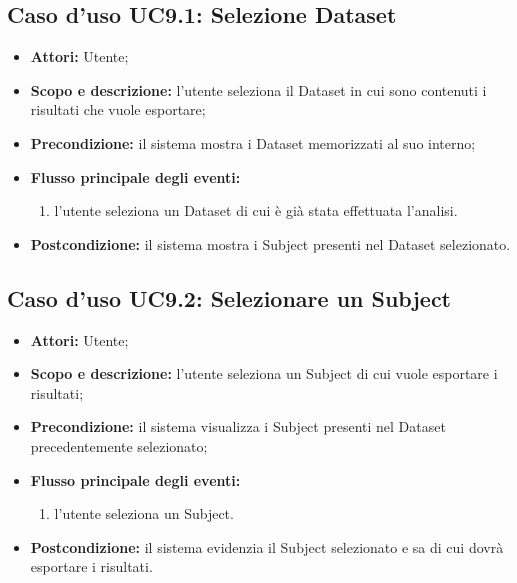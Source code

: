 \subsection{Caso d'uso UC9.1: Selezione Dataset}
\begin{itemize}
\item \textbf{Attori:} Utente;
\item \textbf{Scopo e descrizione:} l'utente seleziona il Dataset\glossario{} in cui sono contenuti i risultati che vuole esportare;
\item \textbf{Precondizione:} il sistema mostra i Dataset\glossario{} memorizzati al suo interno;
\item \textbf{Flusso principale degli eventi:}
\begin{enumerate}
\item l'utente seleziona un Dataset\glossario{} di cui è già stata effettuata l'analisi. 
\end{enumerate}
\item \textbf{Postcondizione:} il sistema mostra i Subject\glossario{} presenti nel Dataset\glossario{} selezionato.
\end{itemize}

\subsection{Caso d'uso UC9.2: Selezionare un Subject}
\begin{itemize}
\item \textbf{Attori:} Utente;
\item \textbf{Scopo e descrizione:} l'utente seleziona un Subject\glossario{} di cui vuole esportare i risultati;
\item \textbf{Precondizione:} il sistema visualizza i Subject\glossario{} presenti nel Dataset\glossario{} precedentemente selezionato;
\item \textbf{Flusso principale degli eventi:}
\begin{enumerate}
\item l'utente seleziona un Subject\glossario{}.
\end{enumerate}
\item \textbf{Postcondizione:} il sistema evidenzia il Subject\glossario{} selezionato e sa di cui dovrà esportare i risultati.
\end{itemize}

